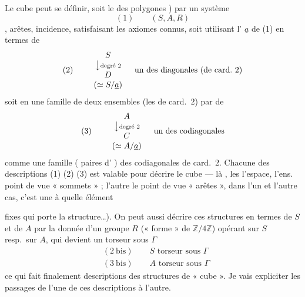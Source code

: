 \documentclass[11pt,a4paper]{article}
\begin{document}
Le cube peut se définir, soit  le  \ill{}
des polygones ) par un système
\[
  (1) \qquad (S, A, R)
\]
, arêtes, incidence, satisfaisant les axiomes connus, soit
 utilisant l' $\underline{a}$ de (1)
en termes de
\[
  (2) \qquad
  \begin{array}{c}
    S \\
    \big\downarrow {\scriptstyle \text{degré } 2} \\
    D \\
    (\simeq S/\underline{a})
  \end{array}
  \quad \text{un des diagonales (de card.\ 2)}
\]
soit en une famille de deux ensembles (les \ill{} de card.\ $2$)
  par \ill{} de
\[
  (3) \qquad
  \begin{array}{c}
    A \\
    \big\downarrow {\scriptstyle \text{degré } 2} \\
    C \\
    (\simeq A/\underline{a})
  \end{array}
  \quad \text{un des codiagonales}
\]
comme une \struck{\ill{}} famille (\ill{} paires d'\struck{\ill{}} \ill{})
des codiagonales de card.\ $2$. Chacune des descriptions (1) (2) (3) est
valable pour décrire le cube --- là \struck{\ill{}}  \struck{\ill{}}
, les 
 \ill{} \ill{} l'espace, l'ens.\ 
\ill{} point de vue \ill{} « sommets » ; l'autre le point de vue
« arêtes »,  \ill{} \ill{} \ill{}  dans
l'un et l'autre cas, c'est une \ill{} à quelle élément \ill{}
 

fixes qui porte la structure\ldots). On peut aussi décrire ces structures en
termes de $S$ et de $A$ par la donnée d'un groupe $R$ (« forme » de
$\mathbb{Z}/4\mathbb{Z}$) opérant sur $S$ resp.\ sur $A$, qui devient un
torseur sous $\Gamma$
\[
  \begin{aligned}
    &(2\ \text{bis}) \qquad S \text{ torseur sous } \Gamma \\
    &(3\ \text{bis}) \qquad A \text{ torseur sous } \Gamma
  \end{aligned}
\]
ce qui fait finalement \struck{\ill{}}  descriptions
des \struck{\ill{}} structures de « cube ». Je vais expliciter les passages
de l'une de ces descriptions à l'autre.
\end{document}
